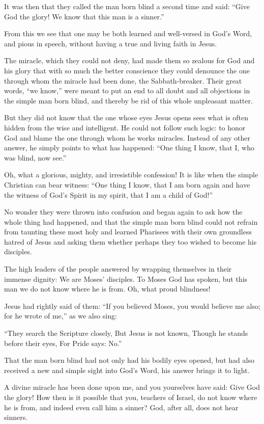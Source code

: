 It was then that they called the man born blind a second time and said: “Give God the glory! We know that this man is a sinner.”

From this we see that one may be both learned and well-versed in God’s Word, and pious in speech, without having a true and living faith in Jesus.

The miracle, which they could not deny, had made them so zealous for God and his glory that with so much the better conscience they could denounce the one through whom the miracle had been done, the Sabbath-breaker. Their great words, “we know,” were meant to put an end to all doubt and all objections in the simple man born blind, and thereby be rid of this whole unpleasant matter.

But they did not know that the one whose eyes Jesus opens sees what is often hidden from the wise and intelligent. He could not follow such logic: to honor God and blame the one through whom he works miracles. Instead of any other answer, he simply points to what has happened: “One thing I know, that I, who was blind, now see.”

Oh, what a glorious, mighty, and irresistible confession! It is like when the simple Christian can bear witness: “One thing I know, that I am born again and have the witness of God’s Spirit in my spirit, that I am a child of God!”

No wonder they were thrown into confusion and began again to ask how the whole thing had happened, and that the simple man born blind could not refrain from taunting these most holy and learned Pharisees with their own groundless hatred of Jesus and asking them whether perhaps they too wished to become his disciples.

The high leaders of the people answered by wrapping themselves in their immense dignity: We are Moses’ disciples. To Moses God has spoken, but this man we do not know where he is from. Oh, what proud blindness!

Jesus had rightly said of them: “If you believed Moses, you would believe me also; for he wrote of me,” as we also sing:

“They search the Scripture closely, But Jesus is not known, Though he stands before their eyes, For Pride says: No.”

That the man born blind had not only had his bodily eyes opened, but had also received a new and simple sight into God’s Word, his answer brings it to light.

A divine miracle has been done upon me, and you yourselves have said: Give God the glory! How then is it possible that you, teachers of Israel, do not know where he is from, and indeed even call him a sinner? God, after all, does not hear sinners.

